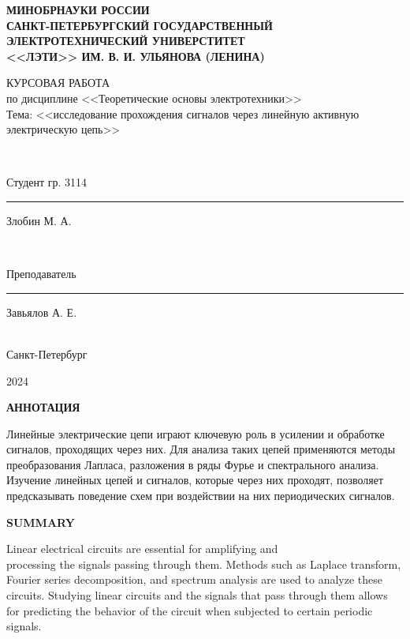 \documentclass[a4paper,14pt ]{article} %
\begin{document}
 
\begin{titlepage}
    \begin{center}
        {\bf  МИНОБРНАУКИ РОССИИ\\
        САНКТ-ПЕТЕРБУРГСКИЙ ГОСУДАРСТВЕННЫЙ\\
        ЭЛЕКТРОТЕХНИЧЕСКИЙ УНИВЕРСТИТЕТ\\
        <<ЛЭТИ>> ИМ. В. И. УЛЬЯНОВА (ЛЕНИНА)\\
    
        }
    \end{center}
    \vfill
        {
        \begin{center}
            КУРСОВАЯ РАБОТА\\
            по дисциплине <<Теоретические основы электротехники>>\\
            Тема: <<исследование прохождения сигналов через линейную активную электрическую цепь>>\\
        \end{center}
        }
        \
    \vfill
        {\noindent\parbox{4cm}{Студент гр. 3114}  \hfill \parbox{3cm}{\rule{3cm}{0.15mm}} \hfill \parbox{4cm}{\raggedleft Злобин М. А.}\\}
        \parbox{4cm}{Преподаватель} \hfill \parbox{3cm}{\rule{3cm}{0.15mm}} \hfill \parbox{4cm}{\raggedleft Завьялов А. Е.} \\ 
        \center Санкт-Петербург
        
        2024
\end{titlepage}
\begin{center}
    {\bf АННОТАЦИЯ} 
\end{center}
    

    {
    Линейные электрические цепи играют ключевую роль в усилении и обработке сигналов, 
    проходящих через них. Для анализа таких цепей применяются методы преобразования Лапласа, 
    разложения в ряды Фурье и спектрального анализа. Изучение линейных цепей и сигналов, 
    которые через них проходят, позволяет предсказывать поведение схем при воздействии на них периодических сигналов.
    }
\begin{center}
    {\bf SUMMARY}
\end{center}


Linear electrical circuits are essential for amplifying and\\ processing the signals passing through them. 
Methods such as Laplace transform, Fourier series decomposition, and spectrum analysis are used to analyze these circuits. 
Studying linear circuits and the signals that pass through them allows for predicting the behavior of the circuit when subjected to certain periodic signals.
\newpage
\tableofcontents
\newpage
\end{document}
